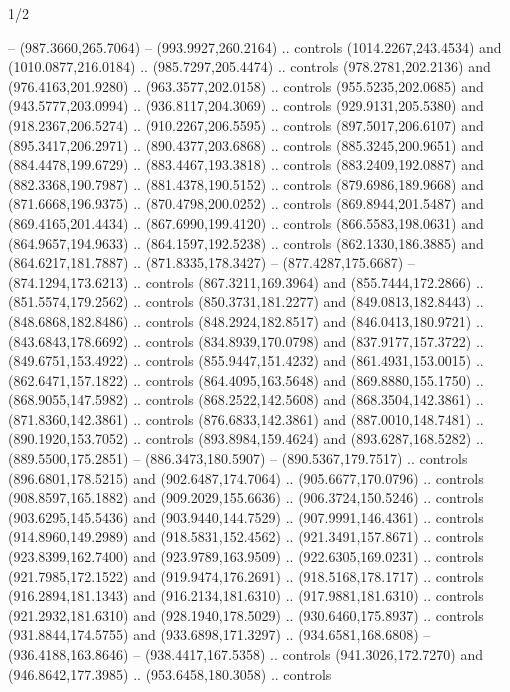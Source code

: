 \begin{flagdescription}{1/2}
\begin{scope}[shift={(2*\flaglength/3-0.25*\rb,0.51333\flagwidth)},scale=0.001715\flagwidth*\stretchfactor]
\begin{scope}[y=-1pt, x=1pt,cm={{1.04354,0.0,0.0,1.01818,(-827,-297)}}]
\begin{scope}[fill=gold]
  -- (987.3660,265.7064) -- (993.9927,260.2164) .. controls (1014.2267,243.4534)
  and (1010.0877,216.0184) .. (985.7297,205.4474) .. controls
  (978.2781,202.2136) and (976.4163,201.9280) .. (963.3577,202.0158) .. controls
  (955.5235,202.0685) and (943.5777,203.0994) .. (936.8117,204.3069) .. controls
  (929.9131,205.5380) and (918.2367,206.5274) .. (910.2267,206.5595) .. controls
  (897.5017,206.6107) and (895.3417,206.2971) .. (890.4377,203.6868) .. controls
  (885.3245,200.9651) and (884.4478,199.6729) .. (883.4467,193.3818) .. controls
  (883.2409,192.0887) and (882.3368,190.7987) .. (881.4378,190.5152) .. controls
  (879.6986,189.9668) and (871.6668,196.9375) .. (870.4798,200.0252) .. controls
  (869.8944,201.5487) and (869.4165,201.4434) .. (867.6990,199.4120) .. controls
  (866.5583,198.0631) and (864.9657,194.9633) .. (864.1597,192.5238) .. controls
  (862.1330,186.3885) and (864.6217,181.7887) .. (871.8335,178.3427) --
  (877.4287,175.6687) -- (874.1294,173.6213) .. controls (867.3211,169.3964) and
  (855.7444,172.2866) .. (851.5574,179.2562) .. controls (850.3731,181.2277) and
  (849.0813,182.8443) .. (848.6868,182.8486) .. controls (848.2924,182.8517) and
  (846.0413,180.9721) .. (843.6843,178.6692) .. controls (834.8939,170.0798) and
  (837.9177,157.3722) .. (849.6751,153.4922) .. controls (855.9447,151.4232) and
  (861.4931,153.0015) .. (862.6471,157.1822) .. controls (864.4095,163.5648) and
  (869.8880,155.1750) .. (868.9055,147.5982) .. controls (868.2522,142.5608) and
  (868.3504,142.3861) .. (871.8360,142.3861) .. controls (876.6833,142.3861) and
  (887.0010,148.7481) .. (890.1920,153.7052) .. controls (893.8984,159.4624) and
  (893.6287,168.5282) .. (889.5500,175.2851) -- (886.3473,180.5907) --
  (890.5367,179.7517) .. controls (896.6801,178.5215) and (902.6487,174.7064) ..
  (905.6677,170.0796) .. controls (908.8597,165.1882) and (909.2029,155.6636) ..
  (906.3724,150.5246) .. controls (903.6295,145.5436) and (903.9440,144.7529) ..
  (907.9991,146.4361) .. controls (914.8960,149.2989) and (918.5831,152.4562) ..
  (921.3491,157.8671) .. controls (923.8399,162.7400) and (923.9789,163.9509) ..
  (922.6305,169.0231) .. controls (921.7985,172.1522) and (919.9474,176.2691) ..
  (918.5168,178.1717) .. controls (916.2894,181.1343) and (916.2134,181.6310) ..
  (917.9881,181.6310) .. controls (921.2932,181.6310) and (928.1940,178.5029) ..
  (930.6460,175.8937) .. controls (931.8844,174.5755) and (933.6898,171.3297) ..
  (934.6581,168.6808) -- (936.4188,163.8646) -- (938.4417,167.5358) .. controls
  (941.3026,172.7270) and (946.8642,177.3985) .. (953.6458,180.3058) .. controls

\end{scope}
\end{scope}
\end{scope}
\end{flagdescription}
